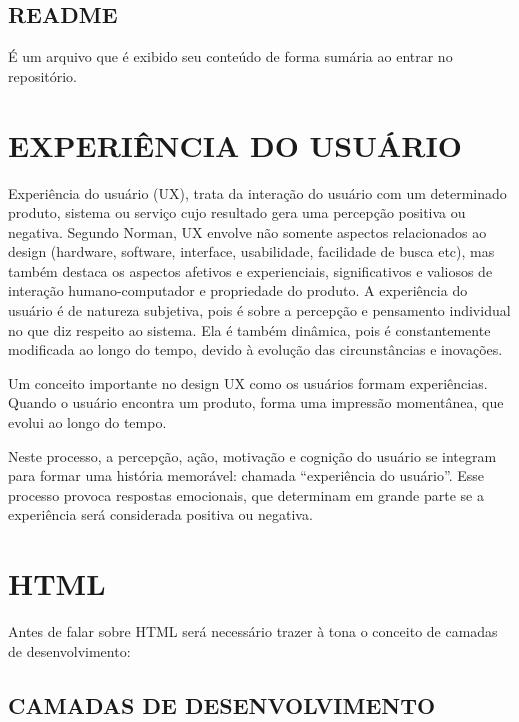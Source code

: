 	\subsection{README}
	\label{subsec:README}
		É um arquivo que é exibido seu conteúdo de forma sumária ao entrar no repositório.

	
\section{EXPERIÊNCIA DO USUÁRIO}
\label{sec:EXPERIENCIADOUSUARIO}

	Experiência do usuário (UX), trata da interação do usuário com um
	determinado produto, sistema ou serviço cujo resultado gera uma
	percepção positiva ou negativa. Segundo Norman, UX envolve não somente
	aspectos relacionados ao design (hardware, software, interface,
	usabilidade, facilidade de busca etc), mas também destaca os aspectos
	afetivos e experienciais, significativos e valiosos de interação
	humano-computador e propriedade do produto. A experiência do usuário é
	de natureza subjetiva, pois é sobre a percepção e pensamento individual
	no que diz respeito ao sistema. Ela é também dinâmica, pois é
	constantemente modificada ao longo do tempo, devido à evolução das
	circunstâncias e inovações.
	\cite{ramos2016design}
	
	Um conceito importante no design UX como os usuários formam
	experiências. Quando o usuário encontra um produto, forma uma impressão
	momentânea, que evolui ao longo do tempo.
	\cite{ramos2016design}
	
	Neste processo, a percepção, ação, motivação e cognição do usuário se
	integram para formar uma história memorável: chamada “experiência do
	usuário”. Esse processo provoca respostas emocionais, que determinam em
	grande parte se a experiência será considerada positiva ou negativa.
	\cite{ramos2016design}
	
\section{HTML}
\label{sec:HTML}
	Antes de falar sobre HTML será necessário trazer à tona o conceito de camadas de desenvolvimento:
	\subsection{CAMADAS DE DESENVOLVIMENTO}
	\label{sec:CAMADASDEDESENVOLVIMENTO}
	
